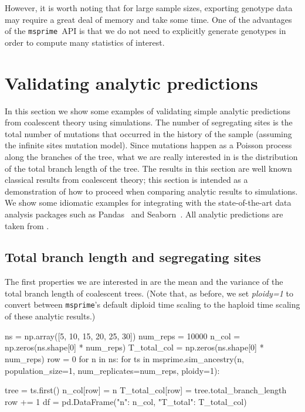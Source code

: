 \documentclass[graybox]{svmult}
\newcommand{\msprime}[0]{\texttt{msprime}}
\begin{document}
However, it is worth noting that for large sample sizes, exporting
genotype data may require a great deal of memory and take some time. One
of the advantages of the \msprime\ API is that we do not need to
explicitly generate genotypes in order to compute many
statistics of interest.

\section{Validating analytic predictions}\label{validating-analytical-predictions}

In this section we show some examples of validating simple analytic
predictions from coalescent theory using simulations. The number of
segregating sites is the total number of mutations that occurred in the
history of the sample (assuming the infinite sites mutation model).
Since mutations happen as a Poisson process along the branches of the
tree, what we are really interested in is the distribution of the total
branch length of the tree. The results in this section are well known
classical results from coalescent theory; this section is intended as a
demonstration of how to proceed when comparing analytic results to
simulations. We show some idiomatic examples for integrating with
the state-of-the-art data analysis packages such
as Pandas~\citep{mckinney2010data} and Seaborn~\citep{michael_waskom_2017_883859}.
All analytic predictions are taken from \cite{wakely2008coalescent}.

\subsection{Total branch length and segregating sites}
The first properties we are interested in are the mean and the
variance of the total branch length of coalescent trees. (Note that, as
before, we set \emph{ploidy=1} to convert between \msprime's default diploid time
scaling to the haploid time scaling of these analytic results.)

\begin{pythoncode}
ns = np.array([5, 10, 15, 20, 25, 30])
num_reps = 10000
n_col = np.zeros(ns.shape[0] * num_reps)
T_total_col = np.zeros(ns.shape[0] * num_reps)
row = 0
for n in ns:
    for ts in msprime.sim_ancestry(n, population_size=1,
            num_replicates=num_reps, ploidy=1):

        tree = ts.first()
        n_col[row] = n
        T_total_col[row] = tree.total_branch_length
        row += 1
df = pd.DataFrame({"n": n_col, "T_total": T_total_col})
\end{pythoncode}
\end{document}
